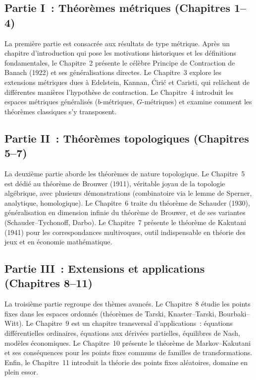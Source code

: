 \subsection*{Partie I~: Th\'eor\`emes m\'etriques (Chapitres 1--4)}

La premi\`ere partie est consacr\'ee aux r\'esultats de type m\'etrique. Apr\`es un
chapitre d'introduction qui pose les motivations historiques et les d\'efinitions
fondamentales, le Chapitre~2 pr\'esente le c\'el\`ebre Principe de Contraction de
Banach (1922) et ses g\'en\'eralisations directes. Le Chapitre~3 explore les
extensions m\'etriques dues \`a Edelstein, Kannan, \'Ciri\'c et Caristi, qui
rel\^achent de diff\'erentes mani\`eres l'hypoth\`ese de contraction. Le Chapitre~4
introduit les espaces m\'etriques g\'en\'eralis\'es ($b$-m\'etriques, $G$-m\'etriques)
et examine comment les th\'eor\`emes classiques s'y transposent.

\subsection*{Partie II~: Th\'eor\`emes topologiques (Chapitres 5--7)}

La deuxi\`eme partie aborde les th\'eor\`emes de nature topologique. Le Chapitre~5
est d\'edi\'e au th\'eor\`eme de Brouwer (1911), v\'eritable joyau de la topologie
alg\'ebrique, avec plusieurs d\'emonstrations (combinatoire via le lemme de Sperner,
analytique, homologique). Le Chapitre~6 traite du th\'eor\`eme de Schauder (1930),
g\'en\'eralisation en dimension infinie du th\'eor\`eme de Brouwer, et de ses variantes
(Schauder--Tychonoff, Darbo). Le Chapitre~7 pr\'esente le th\'eor\`eme de Kakutani
(1941) pour les correspondances multivoques, outil indispensable en th\'eorie des
jeux et en \'economie math\'ematique.

\subsection*{Partie III~: Extensions et applications (Chapitres 8--11)}

La troisi\`eme partie regroupe des th\`emes avanc\'es. Le Chapitre~8 \'etudie les
points fixes dans les espaces ordonn\'es (th\'eor\`emes de Tarski, Knaster--Tarski,
Bourbaki--Witt). Le Chapitre~9 est un chapitre transversal d'applications~:
\'equations diff\'erentielles ordinaires, \'equations aux d\'eriv\'ees partielles,
\'equilibres de Nash, mod\`eles \'economiques. Le Chapitre~10 pr\'esente le
th\'eor\`eme de Markov--Kakutani et ses cons\'equences pour les points fixes communs
de familles de transformations. Enfin, le Chapitre~11 introduit la th\'eorie des
points fixes al\'eatoires, domaine en plein essor.

